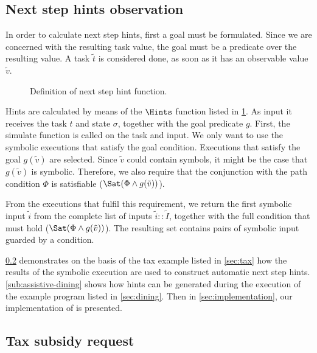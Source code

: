 

\subsection{Next step hints observation}
\label{sub:hints}


In order to calculate next step hints, first a goal must be formulated.
Since we are concerned with the resulting task value, the goal must be a predicate over the resulting value.
A task $\tilde{t}$ is considered done, as soon as it has an observable value $\tilde{v}$.

\begin{figure}
  \caption{Definition of next step hint function.}
  \label{fig:hints}
\end{figure}


Hints are calculated by means of the $\Hints$ function listed in \cref{fig:hints}.
As input it receives the task $t$ and state $\sigma$, together with the goal predicate $g$.
First, the simulate function is called on the task and input.
We only want to use the symbolic executions that satisfy the goal condition.
Executions that satisfy the goal $g(\tilde{v})$ are selected.
Since $\tilde{v}$ could contain symbols, it might be the case that $g(\tilde{v})$ is symbolic.
Therefore, we also require that the conjunction with the path condition $\Phi$ is satisfiable ($\Sat(\Phi\land g(\tilde{v}))$).

From the executions that fulfil this requirement, we return the first symbolic input $\tilde{i}$ from the complete list of inputs $\tilde{i}::\tilde{I}$,
together with the full condition that must hold ($\Sat(\Phi\land g(\tilde{v}))$).
The resulting set contains pairs of symbolic input guarded by a condition.

\cref{sub:assistive-tax} demonstrates on the basis of the tax example listed in \cref{sec:tax} how the results of the symbolic execution are used to construct automatic next step hints.
\cref{sub:assistive-dining} shows how hints can be generated during the execution of the example \TOPHAT program listed in \cref{sec:dining}.
Then in \cref{sec:implementation}, our implementation of \ASTOPHAT is presented.


\subsection{Tax subsidy request}
\label{sub:assistive-tax}

